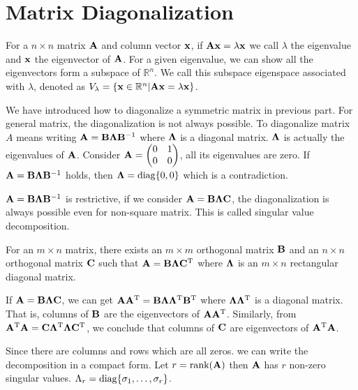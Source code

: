 \section{Matrix Diagonalization}
For a $n\times n$ matrix $\mathbf{A}$ and column vector $\mathbf{x}$, if $\mathbf{A} \mathbf{x} = \lambda \mathbf{x}$ we call $\lambda$ the eigenvalue and $\mathbf{x}$ the eigenvector of $\mathbf{A}$. For a given eigenvalue, we can show all the eigenvectors form a subspace of $\mathbb{R}^n$.  We call this subspace eigenspace associated with $\lambda$, denoted as $V_{\lambda}=\{\mathbf{x} \in \mathbb{R}^n | \mathbf{A}\mathbf{x} = \lambda \mathbf{x} \}$.

We have introduced how to diagonalize a symmetric matrix in previous part. For general matrix, the diagonalization is not always possible. 
To diagonalize matrix $A$ means writing $\mathbf{A} = \mathbf{B} \mathbf{\Lambda} \mathbf{B}^{-1}$ where $\mathbf{\Lambda}$ is a diagonal matrix. $\mathbf{\Lambda}$ is actually the eigenvalues of $\mathbf{A}$. Consider
$\mathbf{A}=\begin{pmatrix} 0 & 1 \\ 0 & 0 \end{pmatrix}$, all its eigenvalues are zero. If $\mathbf{A} = \mathbf{B} \mathbf{\Lambda} \mathbf{B}^{-1}$ holds, then $\mathbf{\Lambda} = \operatorname{diag}\{0,0\}$ which is a contradiction.

$\mathbf{A} = \mathbf{B} \mathbf{\Lambda} \mathbf{B}^{-1}$ is restrictive, if we consider $\mathbf{A} = \mathbf{B} \mathbf{\Lambda} \mathbf{C}$, the diagonalization is always possible even for non-square matrix. This is called singular value decomposition.
\begin{theorem}
	For an $m\times n$ matrix, there exists an $m\times m$ orthogonal matrix $\mathbf{B}$ and an $n \times n$ orthogonal matrix $\mathbf{C}$ such that $\mathbf{A} = \mathbf{B} \mathbf{\Lambda} \mathbf{C}^{\mathrm{T}}$ where $\mathbf{\Lambda}$ is an $m \times n$ rectangular diagonal matrix.
\end{theorem}
If $\mathbf{A} = \mathbf{B} \mathbf{\Lambda} \mathbf{C}$, we can get $\mathbf{A}\mathbf{A}^{\mathrm{T}} = \mathbf{B} \mathbf{\Lambda}\mathbf{\Lambda}^{\mathrm{T}} \mathbf{B}^{\mathrm{T}}$ where $\mathbf{\Lambda}\mathbf{\Lambda}^{\mathrm{T}}$ is a diagonal matrix. That is, columns of $\mathbf{B}$ are the eigenvectors of $\mathbf{A}\mathbf{A}^{\mathrm{T}}$. Similarly, from $\mathbf{A}^{\mathrm{T}} \mathbf{A} = \mathbf{C} \mathbf{\Lambda}^{\mathrm{T}} \mathbf{\Lambda} \mathbf{C}^{\mathrm{T}}$, we conclude that columns of $\mathbf{C}$ are eigenvectors of $\mathbf{A}^{\mathrm{T}} \mathbf{A}$.

Since there are columns and rows which are all zeros. we can write the decomposition in a compact form. Let $r = \textrm{rank}(\mathbf{A})$ then $\mathbf{A}$ has $r$ non-zero singular values. $\Lambda_r = \operatorname{diag}\{\sigma_1, \dots, \sigma_r\}$.
